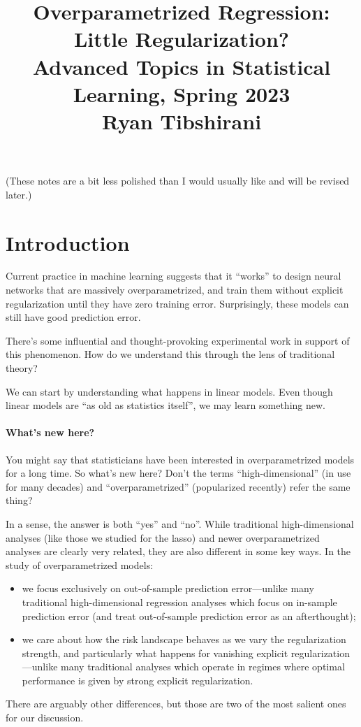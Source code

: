 \documentclass{article}
\title{Overparametrized Regression: Little Regularization? \\ \smallskip
\large Advanced Topics in Statistical Learning, Spring 2023 \\ \smallskip
Ryan Tibshirani }
\date{}
\begin{document}
\maketitle
\RaggedRight
\vspace{-50pt}

(These notes are a bit less polished than I would usually like and will be
revised later.)  

\section{Introduction}

Current practice in machine learning suggests that it ``works'' to design neural
networks that are massively overparametrized, and train them without explicit
regularization until they have zero training error. Surprisingly, these models
can still have good prediction error.   

There's some influential and thought-provoking experimental work in support of
this phenomenon. How do we understand this through the lens of traditional
theory?  

We can start by understanding what happens in linear models. Even though linear
models are ``as old as statistics itself'', we may learn something new.  

\paragraph{What's new here?}

You might say that statisticians have been interested in overparametrized models
for a long time. So what's new here? Don't the terms ``high-dimensional'' (in
use for many decades) and ``overparametrized'' (popularized recently) refer the
same thing? 

In a sense, the answer is both ``yes'' and ``no''. While traditional
high-dimensional analyses (like those we studied for the lasso) and newer
overparametrized analyses are clearly very related, they are also different in
some key ways. In the study of overparametrized models:
\begin{itemize}
\item we focus exclusively on out-of-sample prediction error---unlike many 
  traditional high-dimensional regression analyses which focus on in-sample
  prediction error (and treat out-of-sample prediction error as an
  afterthought);  
\item we care about how the risk landscape behaves as we vary the regularization  
  strength, and particularly what happens for vanishing explicit
  regularization---unlike many traditional analyses which operate in regimes
  where optimal performance is given by strong explicit regularization.  
\end{itemize}
There are arguably other differences, but those are two of the most salient ones 
for our discussion.
\end{document}
